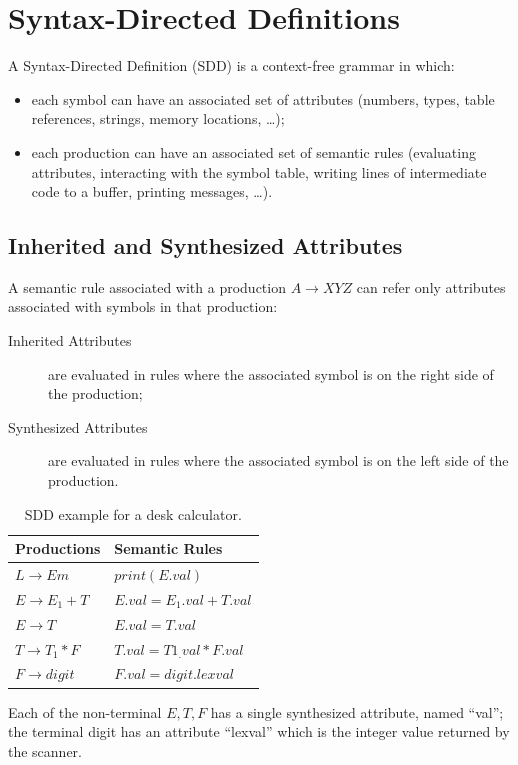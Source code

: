 \section{Syntax-Directed Definitions}
A Syntax-Directed Definition (SDD) is a context-free grammar in which:
\begin{itemize}
    \item each symbol can have an associated set of attributes (numbers, types, table references, strings, memory locations, \ldots);
    \item each production can have an associated set of semantic rules (evaluating attributes, interacting with the symbol table, writing lines of intermediate code to a buffer, printing messages, \ldots).
\end{itemize}

\subsection{Inherited and Synthesized Attributes}
A semantic rule associated with a production $A \to XYZ$ can refer only attributes associated with symbols in that production:
\begin{description}
    \item[Inherited Attributes] are evaluated in rules where the associated symbol is on the right side of the production;
    \item[Synthesized Attributes] are evaluated in rules where the associated symbol is on the left side of the production.
\end{description}

\begin{table}[h]
    \centering
    \begin{tabular}{l|l}
        Productions & Semantic Rules \\ \hline
        $L \to Em$ & $print(E.val)$ \\ \hline
        $E \to E_1 + T$ & $E.val = E_1.val + T.val$ \\ \hline
        $E \to T$ & $E.val = T.val$ \\ \hline
        $T \to T_1 \ast F$ & $T.val = T1_.val \ast F.val$ \\ \hline
        $F \to digit$ & $F.val = digit.lexval$
    \end{tabular}
    \caption{SDD example for a desk calculator.}
\end{table}
Each of the non-terminal $E, T, F$ has a single synthesized attribute, named ``val''; the terminal digit has an attribute ``lexval'' which is the integer value returned by the scanner.

